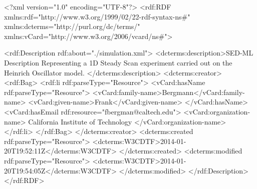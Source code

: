 \begin{example}
<?xml version="1.0" encoding="UTF-8"?>
<rdf:RDF xmlns:rdf="http://www.w3.org/1999/02/22-rdf-syntax-ns#" 
         xmlns:dcterms="http://purl.org/dc/terms/" 
				 xmlns:vCard="http://www.w3.org/2006/vcard/ns#">

   <rdf:Description rdf:about="./simulation.xml">
      <dcterms:description>SED-ML Description Representing a 1D Steady Scan 
			   experiment carried out on the Heinrich Oscillator model. 
			</dcterms:description>
      <dcterms:creator>
         <rdf:Bag>
            <rdf:li rdf:parseType="Resource">
               <vCard:hasName rdf:parseType="Resource">
                  <vCard:family-name>Bergmann</vCard:family-name>
                  <vCard:given-name>Frank</vCard:given-name>
               </vCard:hasName>
               <vCard:hasEmail rdf:resource="fbergman@caltech.edu">
               <vCard:organization-name>
		      California Institute of Technology
	       </vCard:organization-name>
            </rdf:li>
         </rdf:Bag>
      </dcterms:creator>
      <dcterms:created rdf:parseType="Resource">
         <dcterms:W3CDTF>2014-01-20T19:52:11Z</dcterms:W3CDTF>
      </dcterms:created>
      <dcterms:modified rdf:parseType="Resource">
         <dcterms:W3CDTF>2014-01-20T19:54:05Z</dcterms:W3CDTF>
      </dcterms:modified>
   </rdf:Description>
</rdf:RDF>
\end{example}
